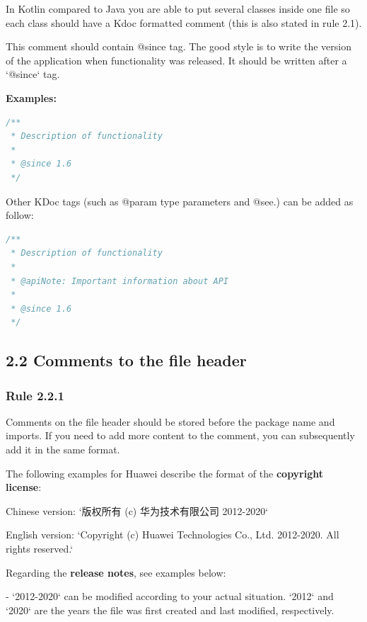 In Kotlin compared to Java you are able to put several classes inside one file so each class should have a Kdoc formatted comment (this is also stated in rule 2.1).

This comment should contain @since tag. The good style is to write the version of the application when functionality was released. It should be written after a `@since` tag.



\textbf{Examples:}



\begin{lstlisting}[language=Kotlin]
/**
 * Description of functionality
 *
 * @since 1.6
 */
\end{lstlisting}


Other KDoc tags (such as @param type parameters and @see.) can be added as follow:

\begin{lstlisting}[language=Kotlin]
/**
 * Description of functionality
 *
 * @apiNote: Important information about API
 *
 * @since 1.6
 */
\end{lstlisting}
\subsection*{\textbf{2.2 Comments to the file header}}

\subsubsection*{\textbf{Rule 2.2.1}}
\leavevmode\newline



Comments on the file header should be stored before the package name and imports. If you need to add more content to the comment, you can subsequently add it in the same format.



The following examples for Huawei describe the format of the \textbf{copyright license}: \

Chinese version: `版权所有 (c) 华为技术有限公司 2012-2020` \

English version: `Copyright (c) Huawei Technologies Co., Ltd. 2012-2020. All rights reserved.`



Regarding the \textbf{release notes}, see examples below:



- `2012-2020` can be modified according to your actual situation. `2012` and `2020` are the years the file was first created and last modified, respectively.

